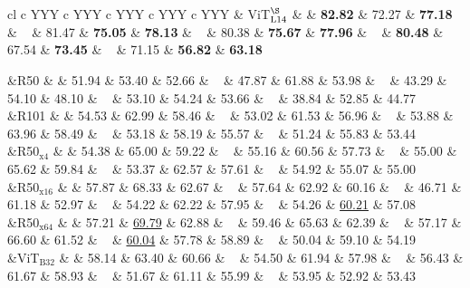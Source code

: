 \begin{table}[!htbp]
\begin{tabularx}{\textwidth}{cl c YYY c YYY c YYY c YYY c YYY}
& {ViT$_{\text{L14}}^\S$} &   & 
 \textbf{82.82} &  72.27 &  \textbf{77.18}  &  ~ &
 81.47 &  \textbf{75.05} &  \textbf{78.13}  &  ~ &
 80.38 &  \textbf{75.67} &  \textbf{77.96}  &  ~ &
 \textbf{80.48} &  67.54 &  \textbf{73.45}  &  ~ &
 71.15 &  \textbf{56.82} &  \textbf{63.18} \\


\midrule

\parbox[t]{1mm}{}
&{R50} &  & 
51.94 & 53.40 & 52.66  & ~ &
47.87 & 61.88 & 53.98  & ~ &
43.29 & 54.10 & 48.10  & ~ &
53.10 & 54.24 & 53.66  & ~ &
38.84 & 52.85 & 44.77  \\

&{R101} &  & 
54.53 & 62.99 & 58.46  & ~ &
53.02 & 61.53 & 56.96  & ~ &
53.88 & 63.96 & 58.49  & ~ &
53.18 & 58.19 & 55.57  & ~ &
51.24 & 55.83 & 53.44  \\

&{R50$_{\text{x4}}$} &  & 
54.38 & 65.00 & 59.22  & ~ &
55.16 & 60.56 & 57.73  & ~ &
55.00 & 65.62 & 59.84  & ~ &
53.37 & 62.57 & 57.61  & ~ &
54.92 & 55.07 & 55.00  \\

&{R50$_{\text{x16}}$} &  & 
57.87 & 68.33 & 62.67  & ~ &
57.64 & 62.92 & 60.16  & ~ &
46.71 & 61.18 & 52.97  & ~ &
54.22 & 62.22 & 57.95  & ~ &
54.26 & \underline{60.21} & 57.08  \\

&{R50$_{\text{x64}}$} &  & 
57.21 & \underline{69.79} & 62.88  & ~ &
59.46 & 65.63 & 62.39  & ~ &
57.17 & 66.60 & 61.52  & ~ &
\underline{60.04} & 57.78 & 58.89  & ~ &
50.04 & 59.10 & 54.19  \\

&{ViT$_{\text{B32}}$} &  & 
58.14 & 63.40 & 60.66  & ~ &
54.50 & 61.94 & 57.98  & ~ &
56.43 & 61.67 & 58.93  & ~ &
51.67 & 61.11 & 55.99  & ~ &
53.95 & 52.92 & 53.43  \\


\end{tabularx}
\end{table}
